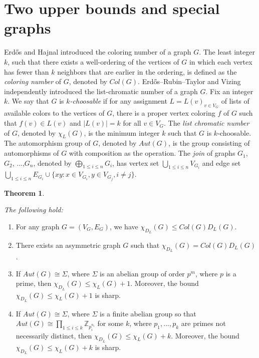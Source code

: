 \documentclass[12pt,reqno,a4paper]{amsart}
\theoremstyle{definition}
\newtheorem{thm}[defn]{Theorem}
\begin{document}
\section{Two upper bounds and special graphs}

Erd\H{o}s and Hajnal \cite{EH1966} introduced 
the coloring number of a graph $G$. The least integer $k$, such that there exists a well-ordering of the vertices of $G$ in which each vertex has fewer than $k$ neighbors that are earlier in the ordering, is defined as the {\em coloring number} of $G$, denoted by $Col(G)$.  
Erd\H{o}s–Rubin–Taylor \cite{ERT1979} and Vizing \cite{Viz1976} independently introduced the list-chromatic number of a graph $G$. Fix an integer $k$. We say that $G$ is {\em $k$-choosable} if for any assignment $L = {L(v)}_{v\in V_{G}}$ of lists of available colors to the vertices of $G$, there is a proper vertex coloring $f$ of $G$ such that $f(v) \in L(v)$ and $\vert L(v)\vert=k$ for all $v\in V_{G}$. The {\em list chromatic number}
of $G$, denoted by $\chi_{L}(G)$, is the minimum integer $k$ such that $G$ is $k$-choosable. The automorphism group of $G$, denoted by $Aut(G)$, is the group consisting of automorphisms of $G$ with composition as the operation. The {\em join} of graphs $G_{1}$, $G_{2}$, ...,$G_{n}$, denoted by $\bigoplus_{1\leq i\leq n} G_{i}$, has
vertex set $\bigcup_{1\leq i\leq n}V_{G_{i}}$ and edge set 
$\bigcup_{1\leq i\leq n}E_{G_{i}}\cup \{xy: x \in V_{G_{i}}, y \in V_{G_{j}}, i \neq j\}$.

\begin{thm}\label{Theorem 5.1}
{\em The following hold:
\begin{enumerate}
    \item For any graph $G=(V_{G},E_{G})$, we have $\chi_{D_{L}}(G)\leq Col(G)D_{L}(G)$.
    \item There exists an asymmetric graph $G$ such that $\chi_{D_{L}}(G)= Col(G)D_{L}(G)$.
    \item If $Aut(G)\cong \Sigma$, where $\Sigma$ is an abelian group of order $p^{m}$, 
    where $p$ is a prime,
    then $\chi_{D_{L}}(G)\leq \chi_{L}(G)+1$. Moreover, the bound $\chi_{D_{L}}(G)\leq \chi_{L}(G)+1$ is sharp. 
    \item If $Aut(G)\cong \Sigma$, where $\Sigma$ is a finite abelian group so that $Aut(G)\cong \prod_{1\leq i\leq k} \mathbb{Z}_{p_{i}^{n_{i}}}$ for some $k$, where $p_{1},...,p_{k}$ are primes not necessarily distinct, then $\chi_{D_{L}}(G)\leq \chi_{L}(G)+k$.
     Moreover, the bound $\chi_{D_{L}}(G)\leq \chi_{L}(G)+k$ is sharp.
\end{enumerate}
}   
\end{thm}
\end{document}
